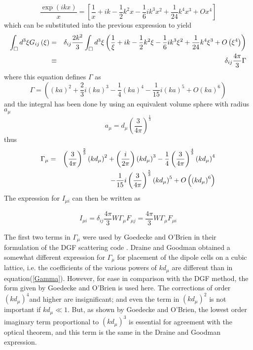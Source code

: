 \documentclass{article}
\begin{document}
\begin{equation}
\frac{\exp (ikx)}{x}=\left[ \frac{1}{x}+ik-\frac{1}{2}k^{2}x-\frac{1}{6}%
ik^{3}x^{2}+\frac{1}{24}k^{4}x^{3}+Ox^{4}\right]
\end{equation}
which can be substituted into the previous expression to yield 
\begin{eqnarray}
\int_{\Box }d^{3}\xi G_{ij}\left( \mathbf{\xi }\right) &=&\delta _{ij}\frac{%
2k^{2}}{3}\int_{\Box }d^{3}\xi \left( \frac{1}{\xi }+ik-\frac{1}{2}k^{2}\xi -%
\frac{1}{6}ik^{3}\xi ^{2}+\frac{1}{24}k^{4}\xi ^{3}+O\left( \xi ^{4}\right)
\right)  \nonumber \\
&\equiv &\delta _{ij}\frac{4\pi }{3}\Gamma
\end{eqnarray}
where this equation defines $\Gamma $ as 
\begin{equation}
\Gamma =\left( \left( ka\right) ^{2}+\allowbreak \frac{2}{3}\allowbreak
i\left( ka\right) ^{3}-\frac{1}{4}\left( ka\right) ^{4}-\frac{1}{15}i\left(
ka\right) ^{5}+O\left( ka\right) ^{6}\right)
\end{equation}
and the integral has been done by using an equivalent volume sphere with
radius $a_{\mu }$ 
\begin{equation}
a_{\mu }=d_{\mu }\left( \frac{3}{4\pi }\right) ^{\frac{1}{3}}
\end{equation}
thus 
\begin{eqnarray}
\Gamma _{\mu } &=&\left( \frac{3}{4\pi }\right) ^{\frac{2}{3}}\left( kd_{\mu
}\right) ^{2}+\allowbreak \allowbreak \left( \frac{\allowbreak \allowbreak i%
}{2\pi }\right) \left( kd_{\mu }\right) ^{3}-\frac{1}{4}\left( \frac{3}{4\pi 
}\right) ^{\frac{4}{3}}\left( kd_{\mu }\right) ^{4}  \label{Gamma} \\
&&-\frac{1}{15}i\left( \frac{3}{4\pi }\right) ^{\frac{5}{3}}\left( kd_{\mu
}\right) ^{5}+O\left( \left( kd_{\mu }\right) ^{6}\right)  \nonumber
\end{eqnarray}
The expression for $I_{\mu i}$ can then be written as

\begin{equation}
I_{\mu i}=\delta _{ij}\frac{4\pi }{3}W\Gamma _{\mu }F_{\mu j}=\frac{4\pi }{3}%
W\Gamma _{\mu }F_{\mu i}  \label{ST}
\end{equation}

The first two terms in $\Gamma _{\mu }$ were used by Goedecke and O'Brien in
their formulation of the DGF scattering code \cite{Goedecke88}. Draine and
Goodman obtained a somewhat different expression for $\Gamma _{\mu }$ for
placement of the dipole cells on a cubic lattice\cite{Draine93}, i.e. the
coefficients of the various powers of $kd_{\mu }$ are different than in
equation(\ref{Gamma}). However, for ease in comparison with the DGF method,
the form given by Goedecke and O'Brien is used here. The corrections of
order $\left( kd_{\mu }\right) ^{4}$and higher are insignificant; and even
the term in $\left( kd_{\mu }\right) ^{2}$ is not important if $kd_{\mu }\ll
1.$ But, as shown by Goedecke and O'Brien, the lowest order imaginary term
proportional to $\left( kd_{\mu }\right) ^{3}$ is essential for agreement
with the optical theorem, and this term is the same in the Draine and
Goodman expression.
\end{document}
